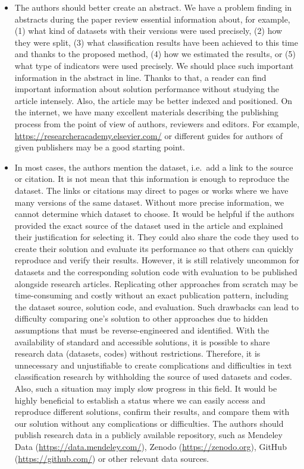 \documentclass[
]{article}
\begin{document}
\begin{itemize}
\item
  The authors should better create an abstract. We have a problem finding in abstracts during the paper review essential information about, for example, (1) what kind of datasets with their versions were used precisely, (2) how they were split, (3) what classification results have been achieved to this time and thanks to the proposed method, (4) how we estimated the results, or (5) what type of indicators were used precisely. We should place such important information in the abstract in line. Thanks to that, a reader can find important information about solution performance without studying the article intensely. Also, the article may be better indexed and positioned. On the internet, we have many excellent materials describing the publishing process from the point of view of authors, reviewers and editors. For example, \url{https://researcheracademy.elsevier.com/} or different guides for authors of given publishers may be a good starting point.
\item
  In most cases, the authors mention the dataset, i.e.~add a link to the source or citation. It is not mean that this information is enough to reproduce the dataset. The links or citations may direct to pages or works where we have many versions of the same dataset. Without more precise information, we cannot determine which dataset to choose. It would be helpful if the authors provided the exact source of the dataset used in the article and explained their justification for selecting it. They could also share the code they used to create their solution and evaluate its performance so that others can quickly reproduce and verify their results. However, it is still relatively uncommon for datasets and the corresponding solution code with evaluation to be published alongside research articles. Replicating other approaches from scratch may be time-consuming and costly without an exact publication pattern, including the dataset source, solution code, and evaluation. Such drawbacks can lead to difficulty comparing one's solution to other approaches due to hidden assumptions that must be reverse-engineered and identified. With the availability of standard and accessible solutions, it is possible to share research data (datasets, codes) without restrictions. Therefore, it is unnecessary and unjustifiable to create complications and difficulties in text classification research by withholding the source of used datasets and codes. Also, such a situation may imply slow progress in this field. It would be highly beneficial to establish a status where we can easily access and reproduce different solutions, confirm their results, and compare them with our solution without any complications or difficulties. The authors should publish research data in a publicly available repository, such as Mendeley Data (\url{https://data.mendeley.com/}), Zenodo (\url{https://zenodo.org}), GitHub (\url{https://github.com/}) or other relevant data sources.

\end{itemize}
\end{document}
